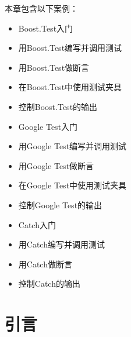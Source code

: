 
本章包含以下案例：



\begin{itemize}
\item Boost.Test入门



\item 用Boost.Test编写并调用测试



\item 用Boost.Test做断言



\item 在Boost.Test中使用测试夹具



\item 控制Boost.Test的输出



\item Google Test入门



\item 用Google Test编写并调用测试



\item 用Google Test做断言



\item 在Google Test中使用测试夹具



\item 控制Google Test的输出



\item Catch入门



\item 用Catch编写并调用测试



\item 用Catch做断言



\item 控制Catch的输出
\end{itemize}



\section{引言}


